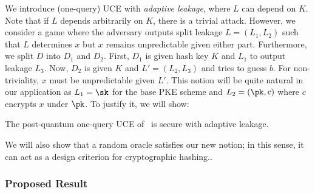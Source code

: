 We introduce (one-query) UCE with \emph{adaptive leakage}, where $L$ can  depend on $K$. Note that if $L$ depends arbitrarily on  $K$,  there is a trivial attack. However, we consider a game where the adversary outputs 
split leakage $L = (L_1,L_2)$ such that $L$ determines $x$ but $x$ remains unpredictable given either part. Furthermore, we split  $D$ into $D_1$ and $D_2$.  First, $D_1$ is given hash key $K$ and $L_1$ to output leakage $L_3$. Now, $D_2$ is given $K$ and $L' = (L_2,L_3)$ and tries to guess $b$. For non-triviality,  $x$ must be unpredictable given $L'$. This notion  will be quite natural in our  application as $L_1 = \sk$ for the base PKE scheme and $L_2 = (\pk,c)$ where $c$ encrypts  $x$ under $\pk$.  To justify it, we  will show:
\begin{conj} \label{conj-fo2}
The post-quantum one-query UCE of~\cite{EC:CheMao25} is secure with adaptive leakage.
\end{conj}

We will also show that a random oracle satisfies our new notion; in this sense, it can act as a design criterion for cryptographic hashing.. %



\subsubsection{Proposed Result} \label{sec-inst-fo}



